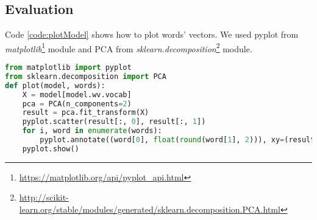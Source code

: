 \subsection{Evaluation}
\label{appendix:plotModel}
Code \ref{code:plotModel} shows how to plot words' vectors. We used pyplot from \textit{matplotlib}\footnote{\url{https://matplotlib.org/api/pyplot_api.html}} module and PCA from \textit{sklearn.decomposition}\footnote{\url{http://scikit-learn.org/stable/modules/generated/sklearn.decomposition.PCA.html}} module.
\begin{lstlisting}[caption={How to plot words' vectors}, label={code:plotModel}, language=Python, breaklines=true, frame=single] 
from matplotlib import pyplot
from sklearn.decomposition import PCA
def plot(model, words):
	X = model[model.wv.vocab]
	pca = PCA(n_components=2)
	result = pca.fit_transform(X)
	pyplot.scatter(result[:, 0], result[:, 1])
	for i, word in enumerate(words):
		pyplot.annotate((word[0], float(round(word[1], 2))), xy=(result[i, 0], result[i, 1]))
	pyplot.show()
\end{lstlisting}


\listoffigures
\listoftables
